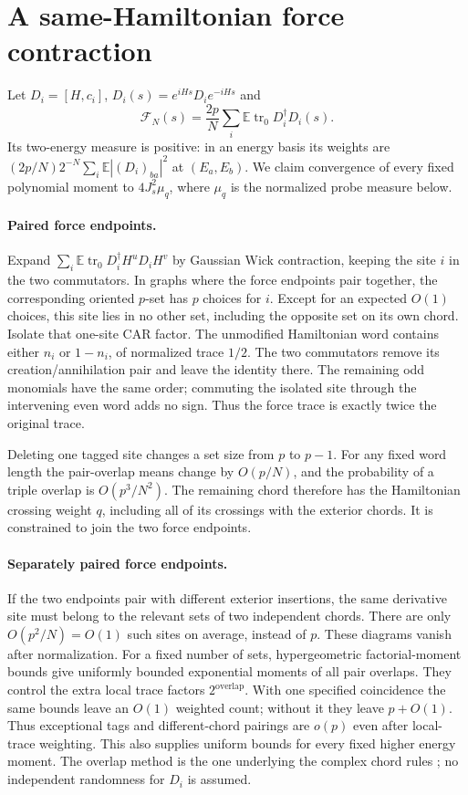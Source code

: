 \documentclass[11pt,a4paper]{article}
\newcommand{\EE}{\mathbb E}
\newcommand{\trz}{\operatorname{tr}_0}
\begin{document}
\newpage
\section{A same-Hamiltonian force contraction}
Let $D_i=[H,c_i]$, $D_i(s)=e^{iHs}D_ie^{-iHs}$ and
\begin{equation}\label{eq:force}
 \mathcal F_N(s)=\frac{2p}{N}\sum_i\EE\trz D_i^\dagger D_i(s).
\end{equation}
Its two-energy measure is positive: in an energy basis its weights are
$(2p/N)2^{-N}\sum_i\EE|(D_i)_{ba}|^2$ at $(E_a,E_b)$.
We claim convergence of every fixed polynomial moment to
$4J_s^2\mu_q$, where $\mu_q$ is the normalized probe measure below.

\paragraph{Paired force endpoints.}
Expand $\sum_i\EE\trz D_i^\dagger H^uD_iH^v$ by Gaussian Wick
contraction, keeping the site $i$ in the two commutators. In graphs
where the force endpoints pair together, the corresponding oriented
$p$-set has $p$ choices for $i$. Except for an expected $O(1)$ choices,
this site lies in no other set, including the opposite set on its own
chord. Isolate that one-site CAR factor. The unmodified Hamiltonian
word contains either $n_i$ or $1-n_i$, of normalized trace $1/2$.
The two commutators remove its creation/annihilation pair and leave
the identity there. The remaining odd monomials have the same order;
commuting the isolated site through the intervening even word adds
no sign. Thus the force trace is exactly twice the original trace.

Deleting one tagged site changes a set size from $p$ to $p-1$.
For any fixed word length the pair-overlap means change by $O(p/N)$,
and the probability of a triple overlap is $O(p^3/N^2)$.
The remaining chord therefore has the Hamiltonian crossing weight
$q$, including all of its crossings with the exterior chords.
It is constrained to join the two force endpoints.

\paragraph{Separately paired force endpoints.}
If the two endpoints pair with different exterior insertions, the
same derivative site must belong to the relevant sets of two
independent chords. There are only $O(p^2/N)=O(1)$ such sites on
average, instead of $p$. These diagrams vanish after normalization.
For a fixed number of sets, hypergeometric factorial-moment bounds
give uniformly bounded exponential moments of all pair overlaps.
They control the extra local trace factors $2^{\text{overlap}}$.
With one specified coincidence the same bounds leave an $O(1)$
weighted count; without it they leave $p+O(1)$. Thus exceptional
tags and different-chord pairings are $o(p)$ even after local-trace
weighting. This also supplies uniform bounds for every fixed higher
energy moment. The overlap method is the one underlying the complex
chord rules \cite{BNR}; no independent randomness for $D_i$ is assumed.
\end{document}
